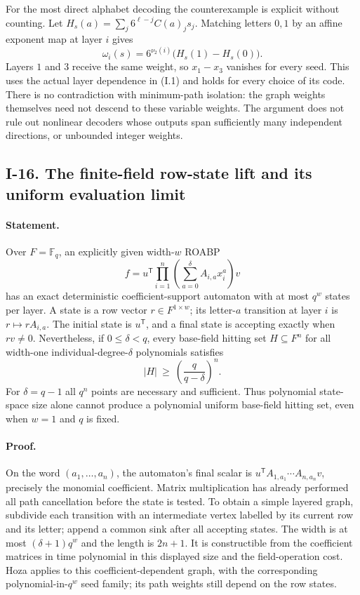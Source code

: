 For the most direct alphabet decoding the counterexample is explicit
without counting.  Let
$H_s(a)=\sum_j6^{\ell-j}C(a)_js_j$.  Matching letters $0,1$ by
an affine exponent map at layer $i$ gives
\[
 \omega_i(s)=6^{\nu_2(i)}\bigl(H_s(1)-H_s(0)\bigr).
\]
Layers $1$ and $3$ receive the same weight, so $x_1-x_3$ vanishes
for every seed.  This uses the actual layer dependence in (I.1)
and holds for every choice of its code.  There is no contradiction
with minimum-path isolation: the graph weights themselves need not
descend to these variable weights.  The argument does not rule out
nonlinear decoders whose outputs span sufficiently many independent
directions, or unbounded integer weights.

\subsection{I-16. The finite-field row-state lift and its uniform evaluation limit}
\label{I-16}

\paragraph{Statement.}
Over $F=\mathbb F_q$, an explicitly given width-$w$ ROABP
\[
 f=u^{\mathsf T}\prod_{i=1}^n
       \left(\sum_{a=0}^{\delta}A_{i,a}x_i^a\right)v
\]
has an exact deterministic coefficient-support automaton with
at most $q^w$ states per layer.  A state is a row vector
$r\in F^{1\times w}$; its letter-$a$ transition at layer $i$ is
$r\mapsto rA_{i,a}$.  The initial state is $u^{\mathsf T}$, and
a final state is accepting exactly when $rv\ne0$.
Nevertheless, if $0\le\delta<q$, every base-field hitting set
$H\subseteq F^n$ for all width-one individual-degree-$\delta$
polynomials satisfies
\[
 |H|\ \ge\ \left(\frac{q}{q-\delta}\right)^n.
\tag{I.16}\label{eq:I-small-field-lower}
\]
For $\delta=q-1$ all $q^n$ points are necessary and sufficient.
Thus polynomial state-space size alone cannot produce a polynomial
uniform base-field hitting set, even when $w=1$ and $q$ is fixed.

\paragraph{Proof.}
On the word $(a_1,\ldots,a_n)$, the automaton's final scalar is
$u^{\mathsf T}A_{1,a_1}\cdots A_{n,a_n}v$, precisely the monomial
coefficient.  Matrix multiplication has already performed all path
cancellation before the state is tested.  To obtain a simple layered
graph, subdivide each transition with an intermediate vertex labelled
by its current row and its letter; append a common sink after all
accepting states.  The width is at most $(\delta+1)q^w$ and the
length is $2n+1$.  It is constructible from the coefficient matrices
in time polynomial in this displayed size and the field-operation
cost.  Hoza applies to this coefficient-dependent graph, with the
corresponding polynomial-in-$q^w$ seed family; its path weights
still depend on the row states.

